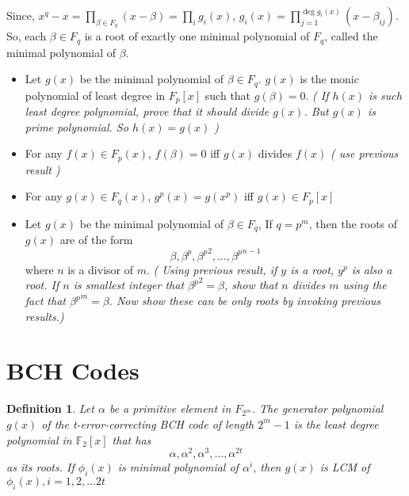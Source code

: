 \documentclass[a4paper]{article}
\theoremstyle{dotless}
\theoremstyle{dotless}
\newtheorem{defn}{Definition}[section]
\theoremstyle{remark}
\begin{document}
Since, $x^q - x = \prod_{\beta \in F_q}(x-\beta) = \prod_i g_i(x)$, 
$g_i(x) = \prod_{j=1}^{\deg{g_i(x)}}(x-\beta_{ij})$. So, each $\beta \in F_q$ is a root of exactly one minimal polynomial of $F_q$, called the minimal polynomial of $\beta$.

\begin{itemize}
\item Let $g(x)$ be the minimal polynomial of $\beta \in F_q$. $g(x)$ is the monic polynomial of least degree in $F_p[x]$ such that $g(\beta) = 0$. 
\textsl{( If $h(x)$ is such least degree polynomial, prove that it should divide $g(x)$. But $g(x)$ is prime polynomial. So $h(x) = g(x)$ ) }

\item For any $f(x) \in F_p(x)$, $f(\beta) = 0$ iff $g(x)$ divides $f(x)$ \textsl{ ( use previous result )}

\item For any $g(x) \in F_q(x)$, $g^p(x) = g(x^p)$ iff $g(x) \in F_p[x]$

\item Let $g(x)$ be the minimal polynomial of $\beta \in F_q$, If $q = p^m$, then the roots of $g(x)$ are of the form
\[
\beta, \beta^p, {\beta^p}^2, \dots , {\beta^p}^{n-1}
\]
where $n$ is a divisor of $m$.
\textsl{ ( Using previous result, if $y$ is a root, $y^p$ is also a root. If $n$ is smallest integer that ${\beta^p}^2 = \beta$, show that $n$ divides $m$ using the fact that ${\beta^p}^m = \beta$. Now show these can be only roots by invoking previous results.)} 
\end{itemize}


\section{BCH Codes}
\begin{defn}
Let $\alpha$ be a primitive element in $F_{2^m}$. The generator polynomial $g(x)$ of the t-error-correcting BCH code of length $2^m-1$ is the least degree polynomial in $\mathbb{F}_2[x]$ that has 
\[\alpha, \alpha^2, \alpha^3, \dots, \alpha^{2t}\] as its roots.
If $\phi_i(x)$ is minimal polynomial of $\alpha^i$, then $g(x)$ is LCM of $\phi_i(x), i = 1,2,\dots 2t$
\end{defn}
\end{document}
